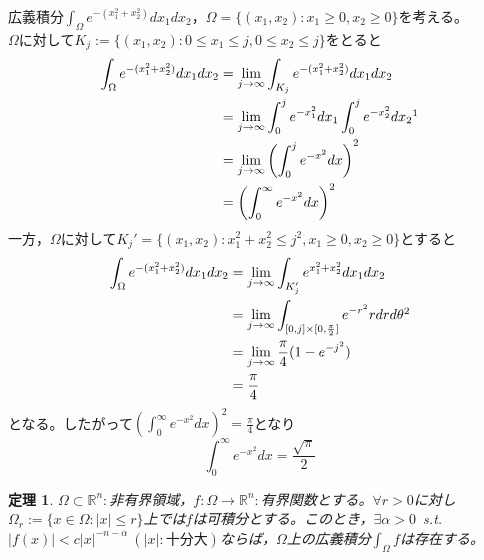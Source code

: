 \documentclass[dvipdfmx,a4j,10pt]{jsarticle}
\makeatletter
\theoremstyle{mystyle1}
\newtheorem{thm}[dfn]{定理}
\theoremstyle{mystyle2}
\newtheorem{ans}{解答}
\renewenvironment{ans}[1][解答]{\par
  \pushQED{\qed}%
  \normalfont
  \topsep6\p@\@plus6\p@ \trivlist
  \item[\hskip\labelsep{\bfseries\sffamily #1}]\ignorespaces
}{%
  \popQED\endtrivlist\@endpefalse
}
\makeatother
\begin{document}
\begin{ans}
	広義積分$\displaystyle\int_\Omega e^{-(x_1^2+x_2^2)}dx_1dx_2$，$\Omega=\{(x_1,x_2):x_1\geq 0,x_2\geq 0\}$を考える。\\$\Omega$に対して$K_j:=\{(x_1,x_2):0\leq x_1\leq j,0\leq x_2\leq j\}$をとると
	\[
	\begin{split}
		\int_\Omega e^{-(x_1^2+x_2^2)}dx_1dx_2
		&= \lim_{j\to\infty}\int_{K_j} e^{-(x_1^2+x_2^2)}dx_1dx_2 \\
		&= \lim_{j\to\infty}\int_0^j e^{-x_1^2}dx_1 \int_0^j e^{-x_2^2}dx_2 \footnotemark\\
		&=\lim_{j\to\infty}\left(\int_0^j e^{-x^2}dx\right)^2 \\
		&=\left(\int_0^\infty e^{-x^2} dx\right)^2
	\end{split}
	\]
	一方，$\Omega$に対して$K_j'=\{(x_1,x_2):x_1^2+x_2^2\leq j^2,x_1\geq 0,x_2\geq 0\}$とすると
	\[
		\begin{split}
		\int_\Omega e^{-(x_1^2+x_2^2)}dx_1dx_2
		&=\lim_{j\to\infty}\int_{K_j'} e^{x_1^2+x_2^2}dx_1dx_2 \\
		&=\lim_{j\to\infty}\int_{[0,j]\times[0,\frac{\pi}{2}]}e^{-r^2}rdrd\theta\footnotemark\\
		&= \lim_{j\to\infty}\frac{\pi}{4}(1-e^{-j^2})\\
		&=\frac{\pi}{4}
		\end{split}
	\]
	となる。したがって$\displaystyle\left(\int_0^\infty e^{-x^2} dx\right)^2= \frac{\pi}{4}$となり
	\[
		\int_0^\infty e^{-x^2}dx=\frac{\sqrt{\pi}}{2}
	\]
\end{ans}

\newpage

\begin{framed}
	\begin{thm}\label{th3.15}
		$\Omega\subset\mathbb{R}^n:$非有界領域，$f:\Omega\to\mathbb{R}^n:$有界関数とする。$\forall r>0$に対し$\Omega_r:=\{x\in\Omega:|x|\leq r\}$上では$f$は可積分とする。このとき，$\exists\alpha>0$\ s.t.\ $|f(x)|<c|x|^{-n-\alpha}\ (|x|:十分大)$ならば，$\Omega$上の広義積分$\displaystyle\int_\Omega f$は存在する。
	\end{thm}
\end{framed}
\end{document}
